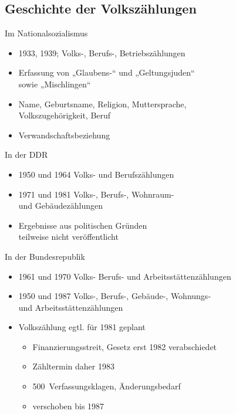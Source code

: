 \documentclass[ignorenonframetext,ucs]{beamer}
\begin{document}
\subsection{Geschichte der Volkszählungen}

\begin{frame}{Im Nationalsozialismus}\begin{itemize}
\item 1933, 1939; Volks-, Berufs-, Betriebszählungen
\item Erfassung von „Glaubens-“ und „Geltungsjuden“\\sowie „Mischlingen“
\item Name, Geburtsname, Religion, Muttersprache,\\Volkszugehörigkeit, Beruf
\item Verwandschaftsbeziehung
\end{itemize}\end{frame}

\begin{frame}{In der DDR}\begin{itemize}
\item 1950 und 1964 Volks- und Berufszählungen
\item 1971 und 1981 Volks-, Berufs-, Wohnraum-\\und Gebäudezählungen
\item Ergebnisse aus politischen Gründen\\teilweise nicht veröffentlicht
\end{itemize}\end{frame}

\begin{frame}{In der Bundesrepublik}\begin{itemize}
\item 1961 und 1970 Volks- Berufs- und Arbeitsstättenzählungen
\item 1950 und 1987 Volks-, Berufs-, Gebäude-, Wohnungs-\\und Arbeitsstättenzählungen
\item Volkszählung egtl. für 1981 geplant\begin{itemize}
	\item Finanzierungsstreit, Gesetz erst 1982 verabschiedet
	\item Zähltermin daher 1983
	\item 500~Verfassungsklagen, Änderungsbedarf
	\item verschoben bis 1987
\end{itemize}
\end{itemize}\end{frame}
\end{document}
